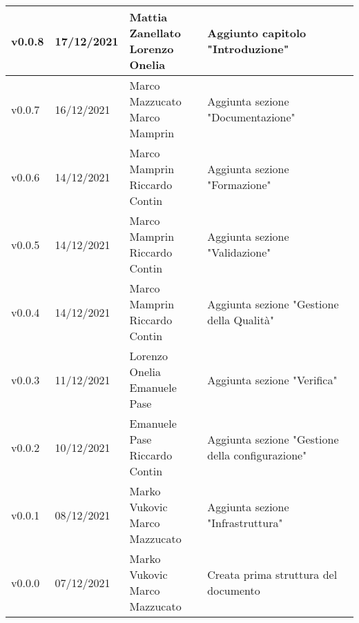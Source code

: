 \begin{center}
\begin{tabular}{|p{2cm}|p{2cm}|p{4cm}|p{5cm}|}
    v0.0.8            & 17/12/2021    & \aCapo{Mattia Zanellato\\Lorenzo Onelia} & Aggiunto capitolo "Introduzione" \\ \hline
    v0.0.7            & 16/12/2021    & \aCapo{Marco Mazzucato\\Marco Mamprin} & Aggiunta sezione "Documentazione" \\ \hline
    v0.0.6            & 14/12/2021    & \aCapo{Marco Mamprin\\Riccardo Contin} & Aggiunta sezione "Formazione" \\ \hline
    v0.0.5            & 14/12/2021    & \aCapo{Marco Mamprin\\Riccardo Contin}   & Aggiunta sezione "Validazione" \\ \hline
    v0.0.4            & 14/12/2021    & \aCapo{Marco Mamprin\\Riccardo Contin}   & Aggiunta sezione "Gestione della Qualità" \\ \hline
    v0.0.3            & 11/12/2021    & \aCapo{Lorenzo Onelia\\Emanuele Pase} & Aggiunta sezione "Verifica" \\ \hline
    v0.0.2            & 10/12/2021    & \aCapo{Emanuele Pase\\Riccardo Contin}  & Aggiunta sezione "Gestione della configurazione" \\ \hline
    v0.0.1            & 08/12/2021    & \aCapo{Marko Vukovic\\Marco Mazzucato}   & Aggiunta sezione "Infrastruttura" \\ \hline
    v0.0.0            & 07/12/2021    & \aCapo{Marko Vukovic\\Marco Mazzucato}   & Creata prima struttura del documento \\ \hline
  \end{tabular}
\end{center}
